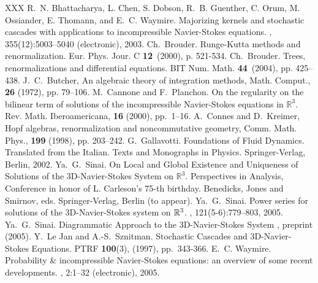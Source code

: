 \documentclass[a4paper,12pt,reqno]{amsart}
\newcommand{\1}{{\bf 1}}
\newcommand{\RR}{\mathbb{R}}
\begin{document}
\begin{thebibliography}{XXX}
R.~N. Bhattacharya, L. Chen, S. Dobson, R.~B. Guenther, C. Orum,
M. Ossiander, E. Thomann, and E.~C. Waymire.
\newblock Majorizing kernels and stochastic cascades with applications to
  incompressible {N}avier-{S}tokes equations.
, 355(12):5003--5040 (electronic), 2003.
 Ch.~Brouder. Runge-Kutta methods and renormalization. Eur. Phys. Jour. C \textbf{12}~(2000), p. 521-534.
 Ch.~Brouder. Trees, renormalizations and differential
equations. BIT Num. Math. \textbf{ 44}~(2004), pp. 425–438.
 J.~C.~Butcher, An algebraic theory of integration methods, Math. Comput., \textbf{26} (1972), 
pp. 79–106. 
 M.~Cannone and F.~Planchon. On the regularity on the
bilinear term of solutions of the incompressible Navier-Stokes
equations in $\RR^3$. Rev. Math. Iberoamericana, \textbf{16} (2000),
pp.~1--16.
 A.~Connes and D.~Kreimer, Hopf algebras, renormalization
and noncommutative geometry, Comm. Math. Phys., \textbf{199} (1998),
pp. 203–242.
 G.~Gallavotti. Foundations of Fluid Dynamics. Translated from
the Italian. Texts and Monographs in Physics. Springer-Verlag, Berlin, 2002.
 Ya.~G.~Sinai. On Local and Global Existence and
Uniqueness of Solutions of the 3D-Navier-Stokes System on $\RR^3$. 
Perspectives in Analysis, Conference in honor of L. Carleson’s 75-th 
birthday. Benedicks, Jones and Smirnov, eds. Springer-Verlag, Berlin (to appear).
Ya.~G.~Sinai.
\newblock Power series for solutions of the {3D}-{N}avier-{S}tokes
  system on {$\mathbb{R}\sp 3$}.
, 121(5-6):779--803, 2005.
 Ya.~G.~Sinai. Diagrammatic Approach to the 3D-Navier-Stokes System ,
preprint (2005).  
 Y.~Le Jan and A.-S.~Sznitman. Stochastic Cascades and
3D-Navier-Stokes Equations. PTRF \textbf{100}(3), (1997), pp.~343-366.
E.~C. Waymire.
\newblock Probability \& incompressible {N}avier-{S}tokes equations: an
  overview of some recent developments.
, 2:1--32 (electronic), 2005.
\end{thebibliography}

% 
% 
%
\end{document}
